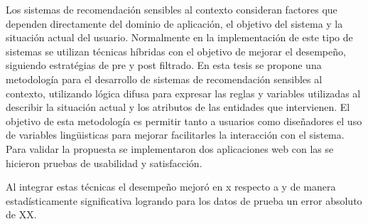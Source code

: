 

% 

 


Los sistemas de recomendaci\'on sensibles al contexto
consideran factores que dependen directamente del
dominio de aplicaci\'on, el objetivo del sistema y la situación actual del usuario.  
Normalmente en la implementaci\'on de este tipo de sistemas  
se utilizan t\'ecnicas h\'ibridas con el objetivo de 
mejorar el desempe\~{n}o, siguiendo estrat\'egias de pre y post
filtrado. En esta tesis se propone una
metodolog\'ia para el desarrollo de sistemas de recomendaci\'on sensibles al contexto,
utilizando l\'ogica difusa para expresar las reglas y variables utilizadas
al describir la situaci\'on actual y los atributos de las entidades que intervienen.
El objetivo de esta metodolog\'ia es permitir tanto a usuarios como dise\~nadores
el uso de variables ling\"uisticas para mejorar facilitarles la interacci\'on con el sistema.
Para validar la propuesta se implementaron dos aplicaciones web con las 
se hicieron pruebas de usabilidad y satisfacción. 

Al integrar estas técnicas el desempeño mejoró en {x} respecto a {y}
de manera estadísticamente significativa logrando para los datos de prueba 
un error absoluto de XX.



